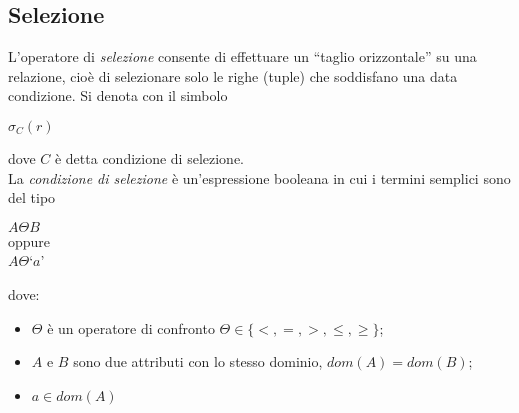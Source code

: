 \subsection{Selezione}
L'operatore di \emph{selezione} consente di effettuare un ``taglio orizzontale'' su una relazione,
cioè di selezionare solo le righe (tuple) che soddisfano una data condizione. Si denota con il
simbolo
\begin{center}
 $\sigma_{C}(r)$
\end{center}
dove $C$ è detta condizione di selezione.\\
La \emph{condizione di selezione} è un'espressione booleana in cui i termini semplici 
sono del tipo
\begin{center}
 $A \Theta B$ \\ oppure \\ $A \Theta$`$a$' \\
\end{center}
dove:
\begin{itemize}
 \item $\Theta$ è un operatore di confronto $\Theta \in \{<, =, >, \leq, \geq\}$;
 \item $A$ e $B$ sono due attributi con lo stesso dominio, $dom(A) = dom(B)$;
 \item $a \in dom(A)$
\end{itemize}

